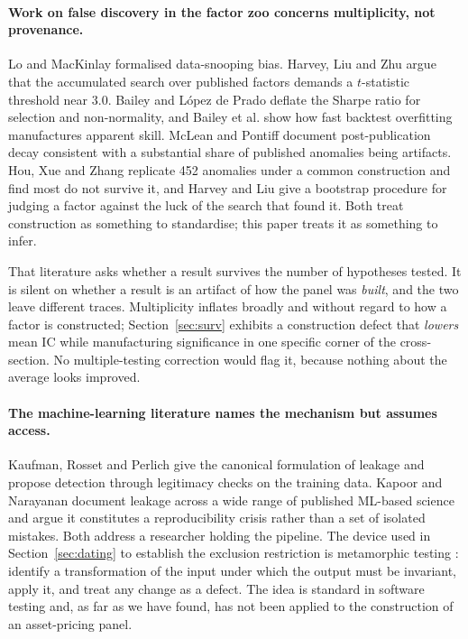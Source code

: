 \documentclass[11pt]{article}
\begin{document}
\paragraph{Work on false discovery in the factor zoo concerns multiplicity, not
provenance.} Lo and MacKinlay \cite{lo1990} formalised data-snooping bias. Harvey, Liu and
Zhu \cite{harvey2016} argue that the accumulated search over published factors demands a
$t$-statistic threshold near $3.0$. Bailey and L\'opez de Prado \cite{bailey2014deflated}
deflate the Sharpe ratio for selection and non-normality, and Bailey et al.
\cite{bailey2014pseudo} show how fast backtest overfitting manufactures apparent skill.
McLean and Pontiff \cite{mclean2016} document post-publication decay consistent with a
substantial share of published anomalies being artifacts. Hou, Xue and Zhang
\cite{hou2020} replicate 452 anomalies under a common construction and find most do not
survive it, and Harvey and Liu \cite{harvey2021lucky} give a bootstrap procedure for
judging a factor against the luck of the search that found it. Both treat construction as
something to standardise; this paper treats it as something to infer.

That literature asks whether a result survives the number of hypotheses tested. It is silent
on whether a result is an artifact of how the panel was \emph{built}, and the two leave
different traces. Multiplicity inflates broadly and without regard to how a factor is
constructed; Section~\ref{sec:surv} exhibits a construction defect that \emph{lowers} mean IC
while manufacturing significance in one specific corner of the cross-section. No
multiple-testing correction would flag it, because nothing about the average looks improved.

\paragraph{The machine-learning literature names the mechanism but assumes access.} Kaufman,
Rosset and Perlich \cite{kaufman2012} give the canonical formulation of leakage and propose
detection through legitimacy checks on the training data. Kapoor and Narayanan
\cite{kapoor2023} document leakage across a wide range of published ML-based science and
argue it constitutes a reproducibility crisis rather than a set of isolated mistakes. Both
address a researcher holding the pipeline. The device used in Section~\ref{sec:dating} to
establish the exclusion restriction is metamorphic testing \cite{chen1998metamorphic}:
identify a transformation of the input under which the output must be invariant, apply it,
and treat any change as a defect. The idea is standard in software testing and, as far as we
have found, has not been applied to the construction of an asset-pricing panel.
\end{document}
